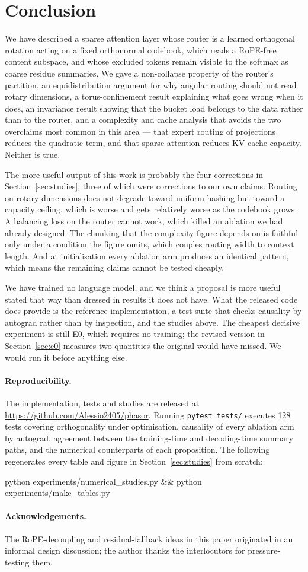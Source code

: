 \section{Conclusion}

We have described a sparse attention layer whose router is a learned orthogonal rotation acting on a fixed orthonormal codebook, which reads a RoPE-free content subspace, and whose excluded tokens remain visible to the softmax as coarse residue summaries. We gave a non-collapse property of the router's partition, an equidistribution argument for why angular routing should not read rotary dimensions, a torus-confinement result explaining what goes wrong when it does, an invariance result showing that the bucket load belongs to the data rather than to the router, and a complexity and cache analysis that avoids the two overclaims most common in this area --- that expert routing of projections reduces the quadratic term, and that sparse attention reduces KV cache capacity. Neither is true.

The more useful output of this work is probably the four corrections in Section~\ref{sec:studies}, three of which were corrections to our own claims. Routing on rotary dimensions does not degrade toward uniform hashing but toward a capacity ceiling, which is worse and gets relatively worse as the codebook grows. A balancing loss on the router cannot work, which killed an ablation we had already designed. The chunking that the complexity figure depends on is faithful only under a condition the figure omits, which couples routing width to context length. And at initialisation every ablation arm produces an identical pattern, which means the remaining claims cannot be tested cheaply.

We have trained no language model, and we think a proposal is more useful stated that way than dressed in results it does not have. What the released code does provide is the reference implementation, a test suite that checks causality by autograd rather than by inspection, and the studies above. The cheapest decisive experiment is still E0, which requires no training; the revised version in Section~\ref{sec:e0} measures two quantities the original would have missed. We would run it before anything else.

\paragraph{Reproducibility.} The implementation, tests and studies are released at \url{https://github.com/Alessio2405/phasor}. Running \texttt{pytest tests/} executes 128 tests covering orthogonality under optimisation, causality of every ablation arm by autograd, agreement between the training-time and decoding-time summary paths, and the numerical counterparts of each proposition. The following regenerates every table and figure in Section~\ref{sec:studies} from scratch:
\begin{center}\small\ttfamily
python experiments/numerical\_studies.py \&\& python experiments/make\_tables.py
\end{center}

\paragraph{Acknowledgements.} The RoPE-decoupling and residual-fallback ideas in this paper originated in an informal design discussion; the author thanks the interlocutors for pressure-testing them.
